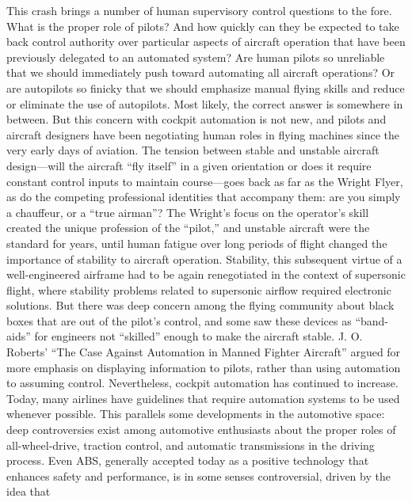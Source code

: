 This crash brings a number of human supervisory control questions to
the fore. What is the proper role of pilots? And how quickly can they
be expected to take back control authority over particular aspects of
aircraft operation that have been previously delegated to an automated
system? Are human pilots so unreliable that we should immediately push
toward automating all aircraft operations? Or are autopilots so
finicky that we should emphasize manual flying skills and reduce or
eliminate the use of autopilots. Most likely, the correct answer is
somewhere in between. But this concern with cockpit automation is not
new, and pilots and aircraft designers have been negotiating human
roles in flying machines since the very early days of aviation. The
tension between stable and unstable aircraft design---will the
aircraft ``fly itself'' in a given orientation or does it require
constant control inputs to maintain course---goes back as far as the
Wright Flyer, as do the competing professional identities that
accompany them: are you simply a chauffeur, or a ``true
airman''\cite[p. 21]{???-DM}? The Wright's focus on the operator's
skill created the unique profession of the
``pilot,'' and unstable aircraft were the standard for years, until
human fatigue over long periods of flight changed the importance of
stability to aircraft operation\cite[p. 22-24]{???-DM}. Stability,
this subsequent virtue of a well-engineered airframe had to be again
renegotiated in the context of supersonic flight, where stability
problems related to supersonic airflow required electronic
solutions\cite[p. 33]{???-DM}. But there was deep concern among the
flying community about black boxes that are out of the pilot's
control, and some saw these devices as ``band-aids'' for engineers not
``skilled'' enough to make the aircraft stable\cite[p. 35]{???-DM}. J.
O. Roberts' ``The Case Against Automation in Manned Fighter Aircraft''
argued for more emphasis on displaying information to pilots, rather
than using automation to assuming control\cite[p. 35]{???-DM}.
Nevertheless, cockpit automation has continued to increase. Today,
many airlines 
have guidelines that require automation systems to be used
whenever possible\cite{???}. This parallels some developments
in the automotive space: deep controversies exist among automotive
enthusiasts about the proper roles of all-wheel-drive, traction
control, and automatic transmissions in the driving process. Even ABS,
generally accepted today as a positive technology that enhances safety and
performance, is in some senses controversial, driven by the idea that
